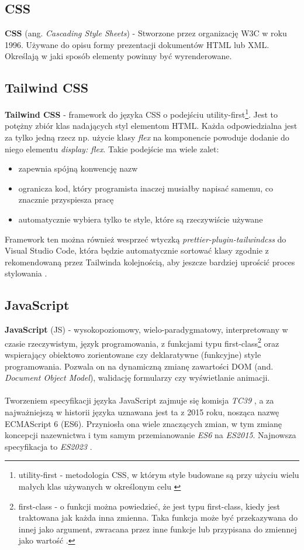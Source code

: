 \documentclass[11pt,a4paper]{article}
\begin{document}
\subsection{CSS}
\textbf{CSS} (ang. \textsl{Cascading Style Sheets}) \cite{css} - Stworzone przez organizację W3C w roku 1996. Używane do opisu formy prezentacji dokumentów HTML lub XML. Określają w jaki sposób elementy powinny być wyrenderowane. 

\subsection{Tailwind CSS}
\textbf{Tailwind CSS} \cite{tailwindcss} - framework do języka CSS o podejściu utility-first\footnote{utility-first - metodologia CSS, w którym style budowane są przy użyciu wielu małych klas używanych w określonym celu \cite{utility-first}}. Jest to potężny zbiór klas nadających styl elementom HTML. Każda odpowiedzialna jest za tylko jedną rzecz np. użycie klasy \textsl{flex} na komponencie powoduje dodanie do niego elementu \textsl{display: flex}. Takie podejście ma wiele zalet:
\begin{itemize}
    \item zapewnia spójną konwencję nazw
    \item ogranicza kod, który programista inaczej musiałby napisać samemu, co znacznie przyspiesza pracę
    \item automatycznie wybiera tylko te style, które są rzeczywiście używane
\end{itemize}

\noindent
Framework ten można również wesprzeć wtyczką \textsl{prettier-plugin-tailwindcss} do Visual Studio Code, która będzie automatycznie sortować klasy zgodnie z rekomendowaną przez Tailwinda kolejnością, aby jeszcze bardziej uprościć proces stylowania \cite{prettier-plugin-tailwindcss}.

\subsection{JavaScript}
\textbf{JavaScript} (JS) \cite{javascript} - wysokopoziomowy, wielo-paradygmatowy, interpretowany w czasie rzeczywistym, język programowania, z funkcjami typu first-class\footnote{first-class - o funkcji można powiedzieć, że jest typu first-class, kiedy jest traktowana jak każda inna zmienna. Taka funkcja może być przekazywana do innej jako argument, zwracana przez inne funkcje lub przypisana do zmiennej jako wartość \cite{first-class}.} oraz wspierający obiektowo zorientowane czy deklaratywne (funkcyjne) style programowania. Pozwala on na dynamiczną zmianę zawartości DOM (and. \textsl{Document Object Model}), walidację formularzy czy wyświetlanie animacji. \\
\\\noindent
Tworzeniem specyfikacji języka JavaScript zajmuje się komisja \textsl{TC39} \cite{tc39}, a za najważniejszą w historii języka uznawana jest ta z 2015 roku, nosząca nazwę ECMAScript 6 (ES6). 
Przyniosła ona wiele znaczących zmian, w tym zmianę koncepcji nazewnictwa i tym samym przemianowanie \textsl{ES6} na \textsl{ES2015}. Najnowsza specyfikacja to \textsl{ES2023} \cite{es2023}.
\end{document}
